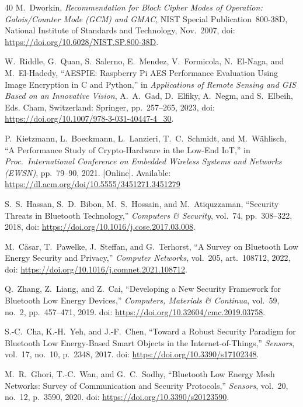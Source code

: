 \documentclass[journal]{IEEEtran}
\begin{document}
\begin{thebibliography}{40}
M.~Dworkin, \emph{Recommendation for Block Cipher Modes of Operation: Galois/Counter Mode (GCM) and GMAC}, NIST Special Publication~800-38D, National Institute of Standards and Technology, Nov.~2007, doi: \url{https://doi.org/10.6028/NIST.SP.800-38D}.

W.~Riddle, G.~Quan, S.~Salerno, E.~Mendez, V.~Formicola, N.~El-Naga, and M.~El-Hadedy, ``AESPIE: Raspberry Pi AES Performance Evaluation Using Image Encryption in C and Python,'' in \emph{Applications of Remote Sensing and GIS Based on an Innovative Vision}, A.~A.~Gad, D.~Elfiky, A.~Negm, and S.~Elbeih, Eds. Cham, Switzerland: Springer, pp.~257--265, 2023, doi: \url{https://doi.org/10.1007/978-3-031-40447-4_30}.

P.~Kietzmann, L.~Boeckmann, L.~Lanzieri, T.~C.~Schmidt, and M.~W{\"a}hlisch, ``A Performance Study of Crypto-Hardware in the Low-End IoT,'' in \emph{Proc.\ International Conference on Embedded Wireless Systems and Networks (EWSN)}, pp.~79--90, 2021. [Online]. Available: \url{https://dl.acm.org/doi/10.5555/3451271.3451279}


S.~S.~Hassan, S.~D.~Bibon, M.~S.~Hossain, and M.~Atiquzzaman, ``Security Threats in Bluetooth Technology,'' \emph{Computers \& Security}, vol.~74, pp.~308--322, 2018, doi: \url{https://doi.org/10.1016/j.cose.2017.03.008}.

M.~C{\"a}sar, T.~Pawelke, J.~Steffan, and G.~Terhorst, ``A Survey on Bluetooth Low Energy Security and Privacy,'' \emph{Computer Networks}, vol.~205, art.~108712, 2022, doi: \url{https://doi.org/10.1016/j.comnet.2021.108712}.


Q.~Zhang, Z.~Liang, and Z.~Cai, ``Developing a New Security Framework for Bluetooth Low Energy Devices,'' \emph{Computers, Materials \& Continua}, vol.~59, no.~2, pp.~457--471, 2019. doi: \url{https://doi.org/10.32604/cmc.2019.03758}.

S.-C.~Cha, K.-H.~Yeh, and J.-F.~Chen, ``Toward a Robust Security Paradigm for Bluetooth Low Energy-Based Smart Objects in the Internet-of-Things,'' \emph{Sensors}, vol.~17, no.~10, p.~2348, 2017. doi: \url{https://doi.org/10.3390/s17102348}.

M.~R.~Ghori, T.-C.~Wan, and G.~C.~Sodhy, ``Bluetooth Low Energy Mesh Networks: Survey of Communication and Security Protocols,'' \emph{Sensors}, vol.~20, no.~12, p.~3590, 2020. doi: \url{https://doi.org/10.3390/s20123590}.


\end{thebibliography}
\end{document}
